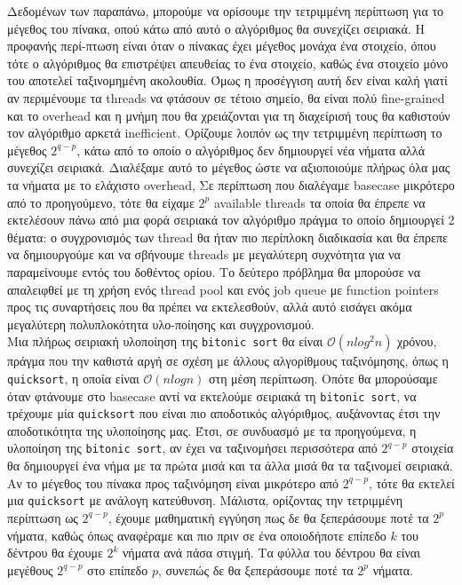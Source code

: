 \documentclass[11pt,a4paper,titlepage]{article}
\begin{document}
		Δεδομένων των παραπάνω, μπορούμε να ορίσουμε την τετριμμένη περίπτωση για το μέγεθος του πίνακα,
		οπού κάτω από αυτό ο αλγόριθμος θα συνεχίζει σειριακά. Η προφανής περί-πτωση είναι όταν ο πίνακας έχει μέγεθος μονάχα ένα στοιχείο, όπου τότε ο αλγόριθμος θα επιστρέψει απευθείας το ένα στοιχείο, καθώς ένα στοιχείο μόνο του αποτελεί ταξινομημένη ακολουθία. Όμως η προσέγγιση αυτή δεν είναι καλή γιατί αν περιμένουμε τα threads να φτάσουν σε τέτοιο σημείο, θα είναι πολύ fine-grained και το overhead και η μνήμη που θα χρειάζονται για τη διαχείρισή τους θα καθιστούν τον αλγόριθμο αρκετά inefficient. Ορίζουμε λοιπόν ως την τετριμμένη περίπτωση το μέγεθος $2^{q-p}$, κάτω από το οποίο ο αλγόριθμος δεν δημιουργεί νέα νήματα αλλά συνεχίζει σειριακά. Διαλέξαμε αυτό το μέγεθος ώστε να αξιοποιούμε πλήρως όλα μας τα νήματα με το ελάχιστο overhead, 
		Σε περίπτωση που διαλέγαμε basecase μικρότερο από το προηγούμενο, τότε θα είχαμε $2^p$ available threads τα οποία θα έπρεπε να εκτελέσουν πάνω από μια φορά σειριακά τον αλγόριθμο πράγμα το οποίο δημιουργεί 2 θέματα: ο συγχρονισμός των thread θα ήταν πιο περίπλοκη διαδικασία και θα έπρεπε να δημιουργούμε και να σβήνουμε threads με μεγαλύτερη συχνότητα για να παραμείνουμε εντός του δοθέντος ορίου. Το δεύτερο πρόβλημα θα μπορούσε να απαλειφθεί με τη χρήση ενός thread pool και ενός job queue με function pointers προς τις συναρτήσεις που θα πρέπει να εκτελεσθούν, αλλά αυτό εισάγει ακόμα μεγαλύτερη πολυπλοκότητα υλο-ποίησης και συγχρονισμού. \\
		
		Μια πλήρως σειριακή υλοποίηση της \verb|bitonic sort| θα είναι $\mathcal{O}(nlog^2n)$ χρόνου, πράγμα που την καθιστά αργή σε σχέση με άλλους αλγορίθμους ταξινόμησης, όπως η \verb|quicksort|, η οποία είναι $\mathcal{O}(nlogn)$ στη μέση περίπτωση. Οπότε θα μπορούσαμε όταν φτάνουμε στο basecase αντί να εκτελούμε σειριακά τη \verb|bitonic sort|, να τρέχουμε μία \verb|quicksort| που είναι πιο αποδοτικός αλγόριθμος, αυξάνοντας έτσι την αποδοτικότητα της υλοποίησης μας. Έτσι, σε συνδυασμό με τα προηγούμενα, η υλοποίηση της \verb|bitonic sort|, αν έχει να ταξινομήσει περισσότερα από $2^{q-p}$ στοιχεία θα δημιουργεί ένα νήμα με τα πρώτα μισά  και τα άλλα μισά θα τα ταξινομεί σειριακά. Αν το μέγεθος του πίνακα προς ταξινόμηση είναι μικρότερο από $2^{q-p}$, τότε θα εκτελεί μια \verb|quicksort| με ανάλογη κατεύθυνση. Μάλιστα, ορίζοντας την τετριμμένη περίπτωση ως $2^{q-p}$, έχουμε μαθηματική εγγύηση πως δε θα ξεπεράσουμε ποτέ τα $2^p$ νήματα, καθώς όπως αναφέραμε και πιο πριν σε ένα οποιοδήποτε επίπεδο $k$ του δέντρου θα έχουμε $2^k$ νήματα ανά πάσα στιγμή. Τα φύλλα του δέντρου θα είναι μεγέθους $2^{q-p}$ στο επίπεδο $p$, συνεπώς δε θα ξεπεράσουμε ποτέ τα $2^p$ νήματα.\\
		
\end{document}
